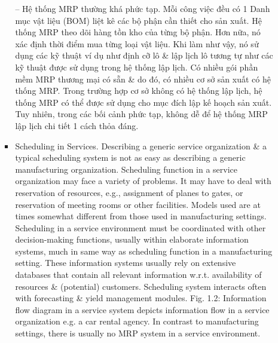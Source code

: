 \documentclass{article}
\begin{document}
\begin{itemize}
\begin{itemize}
\begin{itemize}
            -- Hệ thống MRP thường khá phức tạp. Mỗi công việc đều có 1 Danh mục vật liệu (BOM) liệt kê các bộ phận cần thiết cho sản xuất. Hệ thống MRP theo dõi hàng tồn kho của từng bộ phận. Hơn nữa, nó xác định thời điểm mua từng loại vật liệu. Khi làm như vậy, nó sử dụng các kỹ thuật ví dụ như định cỡ lô \& lập lịch lô tương tự như các kỹ thuật được sử dụng trong hệ thống lập lịch. Có nhiều gói phần mềm MRP thương mại có sẵn \& do đó, có nhiều cơ sở sản xuất có hệ thống MRP. Trong trường hợp cơ sở không có hệ thống lập lịch, hệ thống MRP có thể được sử dụng cho mục đích lập kế hoạch sản xuất. Tuy nhiên, trong các bối cảnh phức tạp, không dễ để hệ thống MRP lập lịch chi tiết 1 cách thỏa đáng.
            \item {\sf Scheduling in Services.} Describing a generic service organization \& a typical scheduling system is not as easy as describing a generic manufacturing organization. Scheduling function in a service organization may face a variety of problems. It may have to deal with reservation of resources, e.g., assignment of planes to gates, or reservation of meeting rooms or other facilities. Models used are at times somewhat different from those used in manufacturing settings. Scheduling in a service environment must be coordinated with other decision-making functions, usually within elaborate information systems, much in same way as scheduling function in a manufacturing setting. These information systems usually rely on extensive databases that contain all relevant information w.r.t. availability of resources \& (potential) customers. Scheduling system interacts often with forecasting \& yield management modules. {\sf Fig. 1.2: Information flow diagram in a service system} depicts information flow in a service organization e.g. a car rental agency. In contrast to manufacturing settings, there is usually no MRP system in a service environment.
            

\end{itemize}
\end{itemize}
\end{itemize}
\end{document}
